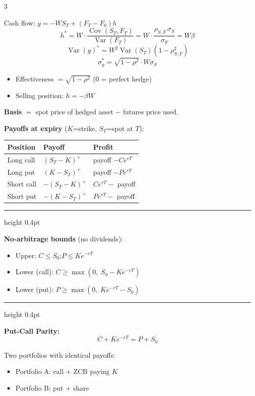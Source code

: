 \documentclass[9pt, a4paper, landscape]{extarticle}
\newcommand{\chbox}[2]{%
  \begin{tcolorbox}[sheet, title={\bfseries\small #1}]
  #2
  \end{tcolorbox}%
}
\newcommand{\boxrule}{\vspace{3pt}\textcolor{ruleclr}{\hrule height 0.4pt}\vspace{3pt}}
\newcommand{\op}[1]{\operatorname{#1}}
\begin{document}
\begin{multicols}{3}
{Cash flow: $y = -WS_T + (F_T - F_0)h$
\[
h^* = W\cdot\frac{\op{Cov}(S_T,F_T)}{\op{Var}(F_T)}
     = W\cdot\frac{\rho_{S,F}\,\sigma_S}{\sigma_F}
     = W\beta
\]
\[
\op{Var}(y)^* = W^2\op{Var}(S_T)(1-\rho_{S,F}^2)
\]
\[
\sigma_y^* = \sqrt{1-\rho^2}\cdot W\sigma_S
\]

\begin{itemize}
  \item Effectiveness $= \sqrt{1-\rho^2}$ \; (0 = perfect hedge)
  \item Selling position: $h = -\beta W$
\end{itemize}

\textbf{Basis} $=$ spot price of hedged asset $-$ futures price used.
}

\chbox{Chapter 5 --- Options}{

\textbf{Payoffs at expiry} ($K$=strike, $S_T$=spot at $T$):

\begin{tabular}{@{}lll@{}}
  \toprule
  Position & Payoff & Profit \\
  \midrule
  Long call  & $(S_T-K)^+$ & payoff $- Ce^{rT}$ \\[2pt]
  Long put   & $(K-S_T)^+$ & payoff $- Pe^{rT}$ \\[2pt]
  Short call & $-(S_T-K)^+$ & $Ce^{rT} -$ payoff \\[2pt]
  Short put  & $-(K-S_T)^+$ & $Pe^{rT} -$ payoff \\
  \bottomrule
\end{tabular}

\boxrule

\textbf{No-arbitrage bounds} (no dividends):
\begin{itemize}
  \item Upper: $C\le S_0$;\quad $P\le Ke^{-rT}$
  \item Lower (call): $C\ge\max(0,\;S_0-Ke^{-rT})$
  \item Lower (put):\; $P\ge\max(0,\;Ke^{-rT}-S_0)$
\end{itemize}

\boxrule

\textbf{Put-Call Parity:}
\[C + Ke^{-rT} = P + S_0\]

Two portfolios with identical payoffs:
\begin{itemize}
  \item Portfolio A: call $+$ ZCB paying $K$
  \item Portfolio B: put $+$ share
\end{itemize}

}
\end{multicols}
\end{document}
